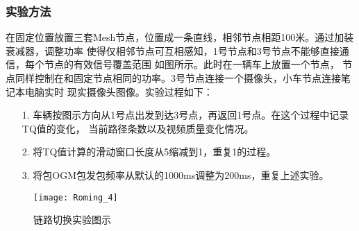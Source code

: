 \renewcommand{\thesubsubsection}{\Alph{subsubsection}.}
\subsubsection{实验方法}
在固定位置放置三套Mesh节点，位置成一条直线，相邻节点相距100米。通过加装衰减器，调整功率
使得仅相邻节点可互相感知，1号节点和3号节点不能够直接通信，每个节点的有效信号覆盖范围
如图所示。此时在一辆车上放置一个节点，
节点同样控制在和固定节点相同的功率。3号节点连接一个摄像头，小车节点连接笔记本电脑实时
现实摄像头图像。实验过程如下：
\begin{itemize}
\item[1.] 车辆按图示方向从1号点出发到达3号点，再返回1号点。在这个过程中记录TQ值的变化，
当前路径条数以及视频质量变化情况。
\item[2.] 将TQ值计算的滑动窗口长度从5缩减到1，重复1的过程。
\item[3.] 将包OGM包发包频率从默认的1000ms调整为200ms，重复上述实验。
\end{itemize}

\begin{figure}[H] %
  \centering
  \texttt{[image: Roming\_4]}
  \caption{链路切换实验图示}
  \label{fig:roming_4}
\end{figure}

